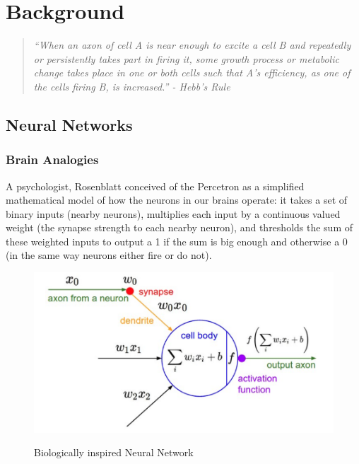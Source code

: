 

\chapter{Background}

\ifpdf
    \graphicspath{{Chapter2/Figs/Raster/}{Chapter2/Figs/PDF/}{Chapter2/Figs/}}
\else
    \graphicspath{{Chapter2/Figs/Vector/}{Chapter2/Figs/}}
\fi



\vspace*{\fill} 
\begin{quote} 
\centering 
\textit{“When an axon of cell A is near enough to excite a cell B and repeatedly or persistently takes part in firing it, some growth process or metabolic change takes place in one or both cells such that A’s efficiency, as one of the cells firing B, is increased.” - Hebb’s Rule}
\end{quote}
\vspace*{\fill}

\section{Neural Networks}
\subsection{Brain Analogies}

A psychologist, Rosenblatt conceived of the Percetron as a simplified mathematical model of how the neurons in our brains operate: it takes a set of binary inputs (nearby neurons), multiplies each input by a continuous valued weight (the synapse strength to each nearby neuron), and thresholds the sum of these weighted inputs to output a 1 if the sum is big enough and otherwise a 0 (in the same way neurons either fire or do not).

\begin{figure}[H]
\begin{center}
\includegraphics[height=.28\textheight]{Chapter2/Figs/NeuralNetwork.png}
\label{fig:Neural_Network}
\caption{Biologically inspired Neural Network \cite{karparthy}}
\end{center}
\end{figure}


